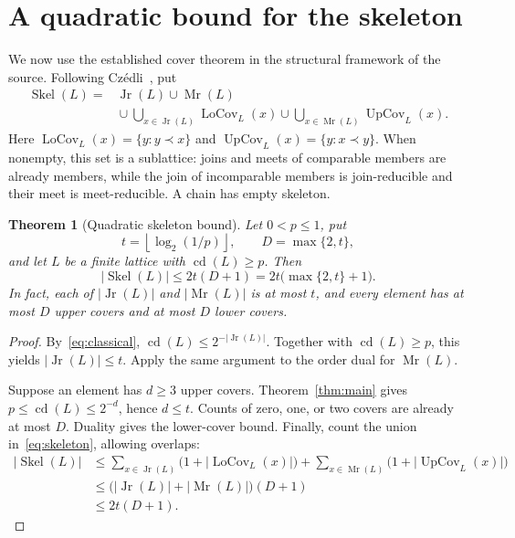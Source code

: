 \documentclass[11pt,a4paper]{article}
\numberwithin{equation}{section}
\newtheorem{theorem}{Theorem}[section]
\theoremstyle{definition}
\theoremstyle{remark}
\DeclareMathOperator{\Jr}{Jr}
\DeclareMathOperator{\Mr}{Mr}
\DeclareMathOperator{\Skel}{Skel}
\DeclareMathOperator{\UpCov}{UpCov}
\DeclareMathOperator{\LoCov}{LoCov}
\DeclareMathOperator{\cdens}{cd}
\newcommand{\card}[1]{\lvert #1\rvert}
\begin{document}
\section{A quadratic bound for the skeleton}\label{sec:skeleton}
We now use the established cover theorem in the structural framework of the
source. Following Cz\'edli~\cite[Section~5, equation~(5.1)]{czedli}, put
\begin{equation}\label{eq:skeleton}
\begin{split}
 \Skel(L)={}&\Jr(L)\cup\Mr(L)\\
 &{}\cup\bigcup_{x\in\Jr(L)}\LoCov_L(x)
 \cup\bigcup_{x\in\Mr(L)}\UpCov_L(x).
\end{split}
\end{equation}
Here $\LoCov_L(x)=\{y:y\prec x\}$ and
$\UpCov_L(x)=\{y:x\prec y\}$.
When nonempty, this set is a sublattice: joins and meets of comparable members
are already members, while the join of incomparable members is join-reducible
and their meet is meet-reducible. A chain has empty skeleton.

\begin{theorem}[Quadratic skeleton bound]\label{thm:skeleton}
Let $0<p\le1$, put
\begin{equation}\label{eq:tD}
 t=\left\lfloor\log_2(1/p)\right\rfloor,
 \qquad D=\max\{2,t\},
\end{equation}
and let $L$ be a finite lattice with $\cdens(L)\ge p$.
Then
\begin{equation}\label{eq:skeleton-bound}
 \card{\Skel(L)}\le2t(D+1)
   =2t\bigl(\max\{2,t\}+1\bigr).
\end{equation}
In fact, each of $\card{\Jr(L)}$ and $\card{\Mr(L)}$ is at most $t$, and every
element has at most $D$ upper covers and at most $D$ lower covers.
\end{theorem}
\begin{proof}
By~\eqref{eq:classical}, $\cdens(L)\le2^{-\card{\Jr(L)}}$.
Together with $\cdens(L)\ge p$, this yields $\card{\Jr(L)}\le t$.
Apply the same argument to the order dual for $\Mr(L)$.

Suppose an element has $d\ge3$ upper covers. Theorem~\ref{thm:main} gives
$p\le\cdens(L)\le2^{-d}$, hence $d\le t$. Counts of zero, one, or two covers
are already at most $D$. Duality gives the lower-cover bound.
Finally, count the union in~\eqref{eq:skeleton}, allowing overlaps:
\begin{align*}
 \card{\Skel(L)}
 &\le\sum_{x\in\Jr(L)}\bigl(1+\card{\LoCov_L(x)}\bigr)
    +\sum_{x\in\Mr(L)}\bigl(1+\card{\UpCov_L(x)}\bigr)\\
 &\le\bigl(\card{\Jr(L)}+\card{\Mr(L)}\bigr)(D+1)\\
 &\le2t(D+1).
\end{align*}
\end{proof}
\end{document}
